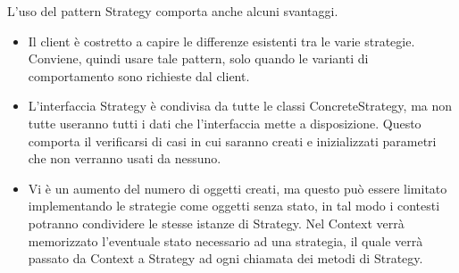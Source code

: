 		L'uso del pattern Strategy comporta anche alcuni svantaggi. 
		\begin{itemize}
			\item Il client è costretto a capire le differenze esistenti tra le varie strategie. Conviene, quindi usare tale pattern, solo quando le varianti di comportamento sono richieste dal client.
			\item L'interfaccia Strategy è condivisa da tutte le classi ConcreteStrategy, ma non tutte useranno tutti i dati che l'interfaccia mette a disposizione. Questo comporta il verificarsi di casi in cui saranno creati e inizializzati parametri che non verranno usati da nessuno.
			\item Vi è un aumento del numero di oggetti creati, ma questo può essere limitato implementando le strategie come oggetti senza stato, in tal modo i contesti potranno condividere le stesse istanze di Strategy. Nel Context verrà memorizzato l'eventuale stato necessario ad una strategia, il quale verrà passato da Context a Strategy ad ogni chiamata dei metodi di Strategy.
		\end{itemize}